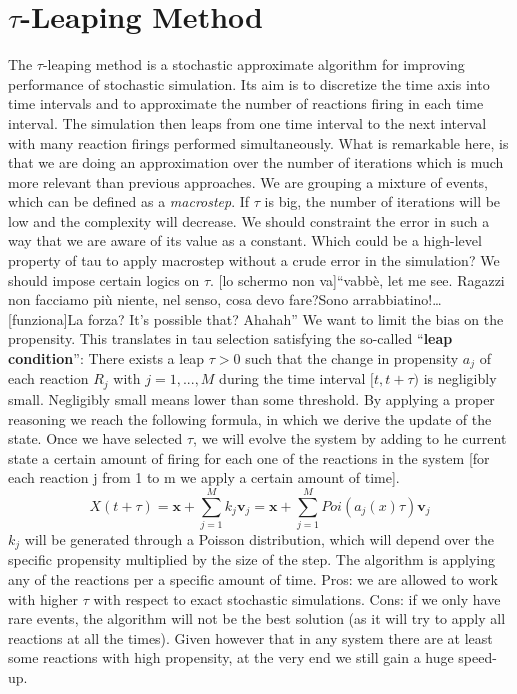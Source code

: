 \section{\texorpdfstring{$\tau$-Leaping Method}{-Leaping Method}}
The $\tau$-leaping method is a stochastic approximate algorithm for improving performance of stochastic simulation.
Its aim is to discretize the time axis into time intervals and to approximate the number of reactions firing in each time interval.
The simulation then leaps from one time interval to the next interval with many reaction firings performed simultaneously.
What is remarkable here, is that we are doing an approximation over the number of iterations which is much more relevant than previous approaches.
We are grouping a mixture of events, which can be defined as a \emph{macrostep}.
If $\tau$ is big, the number of iterations will be low and the complexity will decrease.
We should constraint the error in such a way that we are aware of its value as a constant.
Which could be a high-level property of tau to apply macrostep without a crude error in the simulation? We should impose certain logics on $\tau$.
{[}lo schermo non va{]}``vabbè, let me see.
Ragazzi non facciamo più niente, nel senso, cosa devo fare?Sono arrabbiatino!\ldots{[}funziona{]}La forza? It's possible that? Ahahah''
We want to limit the bias on the propensity.
This translates in tau selection satisfying the so-called ``\textbf{leap condition}'': There exists a leap $\tau > 0$ such that the change in propensity $a_j$ of each reaction $R_j$ with $j = 1,...,M$ during the time interval $[t,t +\tau)$ is negligibly small.
Negligibly small means lower than some threshold.
By applying a proper reasoning we reach the following formula, in which we derive the update of the state.
Once we have selected $\tau$, we will evolve the system by adding to he current state a certain amount of firing for each one of the reactions in the system {[}for each reaction j from 1 to m we apply a certain amount of time{]}.
$$ X(t+\tau)=\mathbf{x}+\sum_{j=1}^{M}k_j\mathbf{v}_j =\mathbf{x}+\sum_{j=1}^{M}Poi(a_j(x)\tau)\mathbf{v}_j $$
$k_j$ will be generated through a Poisson distribution, which will depend over the specific propensity multiplied by the size of the step.
The algorithm is applying any of the reactions per a specific amount of time.
Pros: we are allowed to work with higher $\tau$ with respect to exact stochastic simulations.
Cons: if we only have rare events, the algorithm will not be the best solution (as it will try to apply all reactions at all the times).
Given however that in any system there are at least some reactions with high propensity, at the very end we still gain a huge speed-up.

